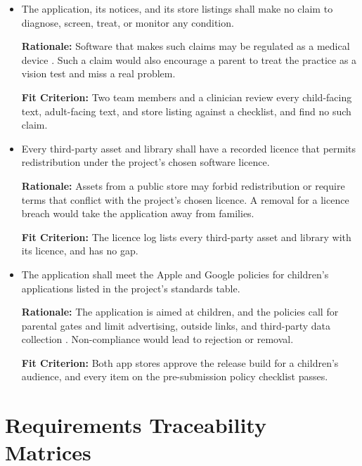 \documentclass[12pt]{article}
\newcounter{nfrnum} %
\begin{document}
\begin{itemize}

\item[\refstepcounter{nfrnum}\textbf{NFR\thenfrnum}\label{NFR_NoClaims}:]
The application, its notices, and its store listings shall make no claim to diagnose, screen, treat, or monitor any condition.

\textbf{Rationale:} Software that makes such claims may be regulated as a medical device \cite{HealthCanadaSaMD}. Such a claim would also encourage a parent to treat the practice as a vision test and miss a real problem.

\textbf{Fit Criterion:} Two team members and a clinician review every child-facing text, adult-facing text, and store listing against a checklist, and find no such claim.

\item[\refstepcounter{nfrnum}\textbf{NFR\thenfrnum}\label{NFR_Licensing}:]
Every third-party asset and library shall have a recorded licence that permits redistribution under the project's chosen software licence.

\textbf{Rationale:} Assets from a public store may forbid redistribution or require terms that conflict with the project's chosen licence. A removal for a licence breach would take the application away from families.

\textbf{Fit Criterion:} The licence log lists every third-party asset and library with its licence, and has no gap.

\item[\refstepcounter{nfrnum}\textbf{NFR\thenfrnum}\label{NFR_StoreCompliance}:]
The application shall meet the Apple and Google policies for children's applications listed in the project's standards table.

\textbf{Rationale:} The application is aimed at children, and the policies call for parental gates and limit advertising, outside links, and third-party data collection \cite{AppleGuidelines, GooglePlayPolicy}. Non-compliance would lead to rejection or removal.

\textbf{Fit Criterion:} Both app stores approve the release build for a children's audience, and every item on the pre-submission policy checklist passes.

\end{itemize}
 

\section{Requirements Traceability Matrices}
\end{document}
